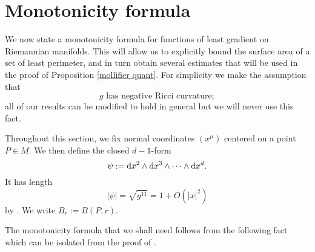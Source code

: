\section{Monotonicity formula}\label{Monotonicity}
We now state a monotonicity formula for functions of least gradient on Riemannian manifolds.
This will allow us to explicitly bound the surface area of a set of least perimeter, and in turn obtain several estimates that will be used in the proof of Proposition \ref{mollifier quant}.
For simplicity we make the assumption that 
\begin{equation}\label{Ricci assumption}
g\text{ has negative Ricci curvature};
\end{equation}
all of our results can be modified to hold in general but we will never use this fact.

Throughout this section, we fix normal coordinates $(x^\mu)$ centered on a point $P \in M$.
We then define the closed $d-1$-form 
\begin{equation}\label{d1 form}
\psi := \mathop{}\!\mathrm{d} x^2 \wedge \mathop{}\!\mathrm{d} x^3 \wedge \cdots \wedge \mathop{}\!\mathrm{d} x^d.
\end{equation}
It has length
\begin{equation}\label{norm of d1 form}
|\psi| = \sqrt{g^{11}} = 1 + O(|x|^2)
\end{equation}
by \cite[Lemma 3.4]{schoen1994lectures}. We write $B_r := B(P, r)$.

The monotonicity formula that we shall need follows from the following fact which can be isolated from the proof of \cite[Lemma 5.8]{Giusti77}.

